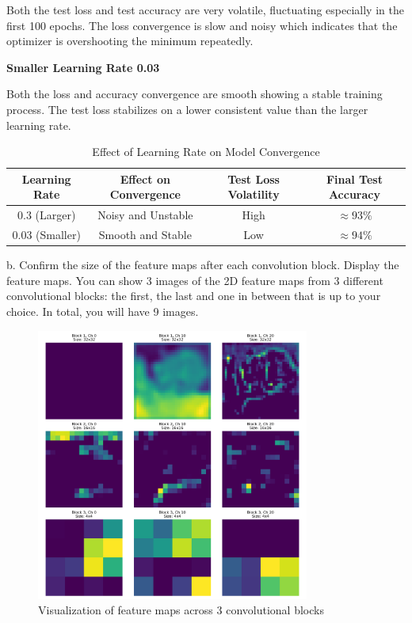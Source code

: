 Both the test loss and test accuracy are very volatile, fluctuating especially in the first 100 epochs. The loss convergence is slow and noisy which indicates that the optimizer is overshooting the minimum repeatedly.

\textbf{Smaller Learning Rate 0.03}

Both the loss and accuracy convergence are smooth showing a stable training process. The test loss stabilizes on a lower consistent value than the larger learning rate.

\begin{table}[h]
    \centering
    \caption{Effect of Learning Rate on Model Convergence}
    \begin{tabular}{|c|c|c|c|}
        \hline
        \textbf{Learning Rate} & \textbf{Effect on Convergence} & \textbf{Test Loss Volatility} & \textbf{Final Test Accuracy} \\
        \hline
        $0.3$ (Larger) & Noisy and Unstable & High & $\approx 93\%$ \\
        \hline
        $0.03$ (Smaller) &  Smooth and Stable & Low & $\approx 94\%$ \\
        \hline
    \end{tabular}
\end{table}

b. Confirm the size of the feature maps after each convolution block. Display the feature maps. You can show 3 images of the 2D feature maps from 3 different convolutional blocks: the first, the last and one in between that is up to your choice. In total, you will have 9 images.

\begin{figure}[H] 
    \centering
    \includegraphics[width=0.8\textwidth]{images/ex_2_feature_maps_visualization} 
    \caption{Visualization of  feature maps across 3 convolutional blocks}
    \label{figure_1}
\end{figure}